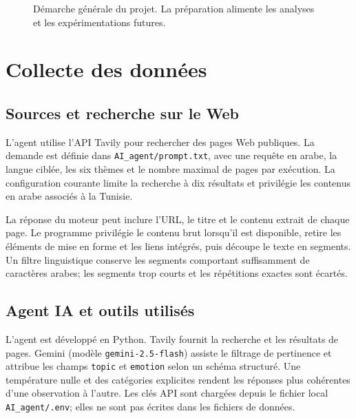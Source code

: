 \documentclass[11pt,a4paper]{article}
\begin{document}
\begin{figure}[H]
\centering
{}
\caption{Démarche générale du projet. La préparation alimente les analyses et les expérimentations futures.}
\end{figure}

\section{Collecte des données}
\subsection{Sources et recherche sur le Web}
L'agent utilise l'API Tavily pour rechercher des pages Web publiques. La demande est définie dans \texttt{AI\_agent/prompt.txt}, avec une requête en arabe, la langue ciblée, les six thèmes et le nombre maximal de pages par exécution. La configuration courante limite la recherche à dix résultats et privilégie les contenus en arabe associés à la Tunisie.

La réponse du moteur peut inclure l'URL, le titre et le contenu extrait de chaque page. Le programme privilégie le contenu brut lorsqu'il est disponible, retire les éléments de mise en forme et les liens intégrés, puis découpe le texte en segments. Un filtre linguistique conserve les segments comportant suffisamment de caractères arabes; les segments trop courts et les répétitions exactes sont écartés.

\subsection{Agent IA et outils utilisés}
L'agent est développé en Python. Tavily fournit la recherche et les résultats de pages. Gemini (modèle \texttt{gemini-2.5-flash}) assiste le filtrage de pertinence et attribue les champs \texttt{topic} et \texttt{emotion} selon un schéma structuré. Une température nulle et des catégories explicites rendent les réponses plus cohérentes d'une observation à l'autre. Les clés API sont chargées depuis le fichier local \texttt{AI\_agent/.env}; elles ne sont pas écrites dans les fichiers de données.
\end{document}
